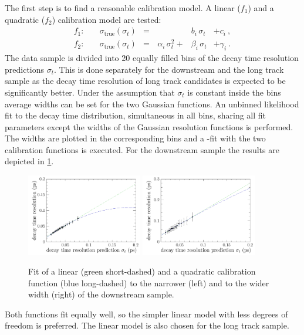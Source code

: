 The first step is to find a reasonable calibration model. A linear ($f_1$) and
a quadratic ($f_2$) calibration model are tested:
\begin{equation}
\begin{aligned}
f_1:&\quad \sigma_{\text{true}}(\sigma_t) &=&  &b_i\,\sigma_t &+ c_i \ , \\
f_2:&\quad \sigma_{\text{true}}(\sigma_t) &=&\, \alpha_i\,\sigma_t^2 + &\beta_i\,\sigma_t &+ \gamma_i \ .
\end{aligned}
\label{eq:resolutioncalibfunctions}
\end{equation}
%
The data sample is divided into \num{20} equally filled bins of the decay time
resolution predictions $\sigma_t$. This is done separately for the downstream
and the long track sample as the decay time resolution of long track
candidates is expected to be significantly better. Under the assumption that
$\sigma_t$ is constant inside the bins average widths can be set for the two
Gaussian functions. An unbinned likelihood fit to the decay time distribution,
simultaneous in all bins, sharing all fit parameters except the widths of the
Gaussian resolution functions is performed. The widths are plotted in the
corresponding bins and a \chisq-fit with the two calibration functions is
executed. For the downstream sample the results are depicted in
\cref{fig:CalibrationOffsetResolution_DD}.
%
\begin{figure}[!htb]
\centering
  \includegraphics[width=0.45\textwidth]{06-Bd2JpsiKS/tikz/pdf/ResolutionCalibration_1_DD.pdf}
  \includegraphics[width=0.45\textwidth]{06-Bd2JpsiKS/tikz/pdf/ResolutionCalibration_2_DD.pdf}
\caption{Fit of a linear (green short-dashed) and a quadratic calibration
function (blue long-dashed) to the narrower (left) and to the wider width
(right) of the downstream sample.}
\label{fig:CalibrationOffsetResolution_DD}
\end{figure}
%
Both functions fit equally well, so the simpler linear model with less degrees
of freedom is preferred. The linear model is also chosen for the long track
sample.

